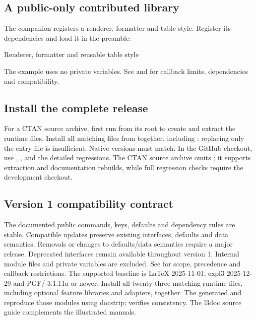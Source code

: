 \subsection{A public-only contributed library}
The companion  registers a renderer,
formatter and table style. Register its dependencies and load it in the preamble:
\begin{source}
\end{source}
\begin{demo}{Renderer, formatter and reusable table style}
\par
{}\par
\begin{center}
\begin{gradtable}[align=c,header align=c,style=demo-report,width=\linewidth]
\end{gradtable}
\end{center}
\end{demo}
The example uses no private variables. See  and
 for callback limits, dependencies and compatibility.
\subsection{Install the complete release}
For a CTAN source archive, first run  from its root
to create  and extract the runtime files. Install all matching
 files from  together, including ; replacing only the entry file is insufficient.
Native versions must match. In the GitHub checkout, use ,
,  and the detailed
 regressions. The CTAN source archive omits
; it supports extraction and documentation rebuilds, while full
regression checks require the development checkout.
\subsection{Version 1 compatibility contract}
The documented public commands, keys, defaults and dependency rules are stable.
Compatible updates preserve existing interfaces, defaults and data semantics.
Removals or changes to defaults/data
semantics require a major release. Deprecated interfaces remain available
throughout version 1. Internal module files and private variables are excluded.
See  for scope, precedence and callback restrictions.
The supported baseline is LaTeX 2025-11-01, expl3 2025-12-29 and PGF/\manualTikZ{}
3.1.11a or newer. Install all twenty-three matching runtime files, including optional feature libraries and adapters, together.
The generated  and  reproduce those modules
using docstrip;  verifies consistency.
The l3doc source guide complements the illustrated manuals.

